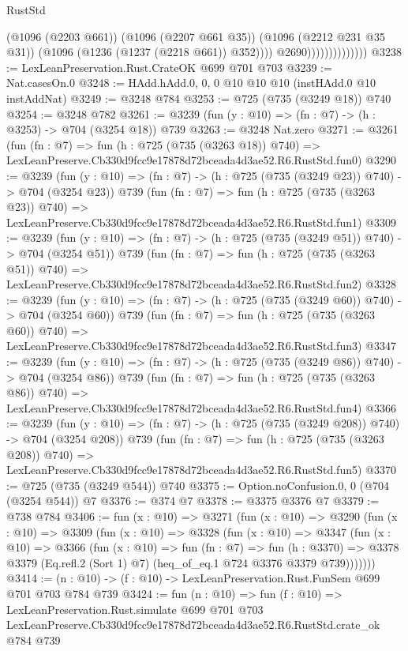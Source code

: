 \begin{lexlean}{RustStd}
\begin{coremodule}
                                    (@1096 (@2203 @661))
                                    (@1096 (@2207 @661 @35))
                                    (@1096 (@2212 @231 @35 @31))
                                    (@1096 (@1236 (@1237 (@2218 @661)) @352))))
                                @2690))))))))))))))
@3238 := LexLeanPreservation.Rust.CrateOK @699 @701 @703
@3239 := Nat.casesOn.{0}
@3248 := HAdd.hAdd.{0, 0, 0} @10 @10 @10 (instHAdd.{0} @10 instAddNat)
@3249 := @3248 @784
@3253 := @725 (@735 (@3249 @18)) @740
@3254 := @3248 @782
@3261 := @3239 (fun (y : @10) => (fn : @7) -> (h : @3253) -> @704 (@3254 @18)) @739
@3263 := @3248 Nat.zero
@3271 := @3261
    (fun (fn : @7) =>
    fun (h : @725 (@735 (@3263 @18)) @740) =>
    LexLeanPreserve.Cb330d9fcc9e17878d72bceada4d3ae52.R6.RustStd.fun0)
@3290 := @3239
    (fun (y : @10) => (fn : @7) -> (h : @725 (@735 (@3249 @23)) @740) -> @704 (@3254 @23))
    @739
    (fun (fn : @7) =>
    fun (h : @725 (@735 (@3263 @23)) @740) =>
    LexLeanPreserve.Cb330d9fcc9e17878d72bceada4d3ae52.R6.RustStd.fun1)
@3309 := @3239
    (fun (y : @10) => (fn : @7) -> (h : @725 (@735 (@3249 @51)) @740) -> @704 (@3254 @51))
    @739
    (fun (fn : @7) =>
    fun (h : @725 (@735 (@3263 @51)) @740) =>
    LexLeanPreserve.Cb330d9fcc9e17878d72bceada4d3ae52.R6.RustStd.fun2)
@3328 := @3239
    (fun (y : @10) => (fn : @7) -> (h : @725 (@735 (@3249 @60)) @740) -> @704 (@3254 @60))
    @739
    (fun (fn : @7) =>
    fun (h : @725 (@735 (@3263 @60)) @740) =>
    LexLeanPreserve.Cb330d9fcc9e17878d72bceada4d3ae52.R6.RustStd.fun3)
@3347 := @3239
    (fun (y : @10) => (fn : @7) -> (h : @725 (@735 (@3249 @86)) @740) -> @704 (@3254 @86))
    @739
    (fun (fn : @7) =>
    fun (h : @725 (@735 (@3263 @86)) @740) =>
    LexLeanPreserve.Cb330d9fcc9e17878d72bceada4d3ae52.R6.RustStd.fun4)
@3366 := @3239
    (fun (y : @10) => (fn : @7) -> (h : @725 (@735 (@3249 @208)) @740) -> @704 (@3254 @208))
    @739
    (fun (fn : @7) =>
    fun (h : @725 (@735 (@3263 @208)) @740) =>
    LexLeanPreserve.Cb330d9fcc9e17878d72bceada4d3ae52.R6.RustStd.fun5)
@3370 := @725 (@735 (@3249 @544)) @740
@3375 := Option.noConfusion.{0, 0} (@704 (@3254 @544)) @7
@3376 := @374 @7
@3378 := @3375 @3376 @7
@3379 := @738 @784
@3406 := fun (x : @10) =>
  @3271
    (fun (x : @10) =>
    @3290
      (fun (x : @10) =>
      @3309
        (fun (x : @10) =>
        @3328
          (fun (x : @10) =>
          @3347
            (fun (x : @10) =>
            @3366
              (fun (x : @10) =>
              fun (fn : @7) =>
              fun (h : @3370) =>
              @3378 @3379 (Eq.refl.{2} (Sort 1) @7) (heq_of_eq.{1} @724 @3376 @3379 @739)))))))
@3414 := (n : @10) -> (f : @10) -> LexLeanPreservation.Rust.FunSem @699 @701 @703 @784 @739
@3424 := fun (n : @10) =>
  fun (f : @10) =>
  LexLeanPreservation.Rust.simulate
    @699
    @701
    @703
    LexLeanPreserve.Cb330d9fcc9e17878d72bceada4d3ae52.R6.RustStd.crate_ok
    @784
    @739
\end{coremodule}
\end{lexlean}
